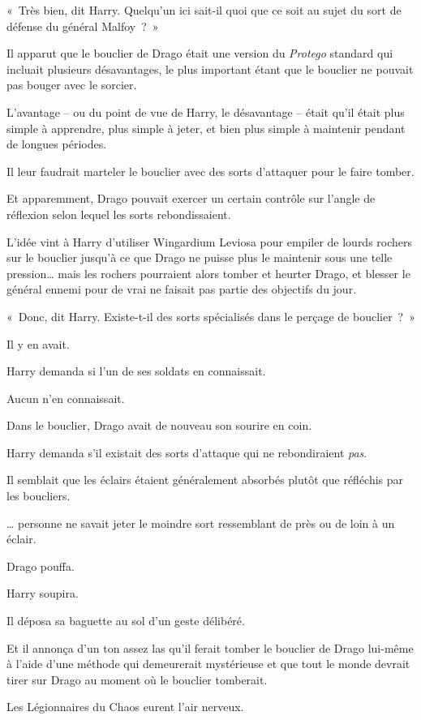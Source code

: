 «~Très bien, dit Harry. Quelqu'un ici sait-il quoi que ce soit au sujet du sort de défense du général Malfoy~?~»

Il apparut que le bouclier de Drago était une version du \emph{Protego} standard qui incluait plusieurs désavantages, le plus important étant que le bouclier ne pouvait pas bouger avec le sorcier.

L'avantage -- ou du point de vue de Harry, le désavantage -- était qu'il était plus simple à apprendre, plus simple à jeter, et bien plus simple à maintenir pendant de longues périodes.

Il leur faudrait marteler le bouclier avec des sorts d'attaquer pour le faire tomber.

Et apparemment, Drago pouvait exercer un certain contrôle sur l'angle de réflexion selon lequel les sorts rebondissaient.

L'idée vint à Harry d'utiliser Wingardium Leviosa pour empiler de lourds rochers sur le bouclier jusqu'à ce que Drago ne puisse plus le maintenir sous une telle pression… mais les rochers pourraient alors tomber et heurter Drago, et blesser le général ennemi pour de vrai ne faisait pas partie des objectifs du jour.

«~Donc, dit Harry. Existe-t-il des sorts spécialisés dans le perçage de bouclier~?~»

Il y en avait.

Harry demanda si l'un de ses soldats en connaissait.

Aucun n'en connaissait.

Dans le bouclier, Drago avait de nouveau son sourire en coin.

Harry demanda s'il existait des sorts d'attaque qui ne rebondiraient \emph{pas}.

Il semblait que les éclairs étaient généralement absorbés plutôt que réfléchis par les boucliers.

… personne ne savait jeter le moindre sort ressemblant de près ou de loin à un éclair.

Drago pouffa.

Harry soupira.

Il déposa sa baguette au sol d'un geste délibéré.

Et il annonça d'un ton assez las qu'il ferait tomber le bouclier de Drago lui-même à l'aide d'une méthode qui demeurerait mystérieuse et que tout le monde devrait tirer sur Drago au moment où le bouclier tomberait.

Les Légionnaires du Chaos eurent l'air nerveux.

